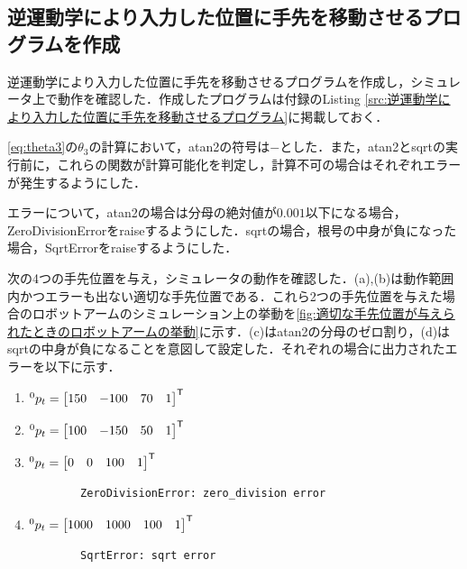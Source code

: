 \documentclass{ltjsarticle}
\begin{document}
\subsection{逆運動学により入力した位置に手先を移動させるプログラムを作成}\label{subsec:逆運動学により入力した位置に手先を移動させるプログラムを作成}
逆運動学により入力した位置に手先を移動させるプログラムを作成し，シミュレータ上で動作を確認した．作成したプログラムは付録のListing \ref{src:逆運動学により入力した位置に手先を移動させるプログラム}に掲載しておく．

\cref{eq:theta3}の$\theta_3$の計算において，atan2の符号は$-$とした．また，atan2とsqrtの実行前に，これらの関数が計算可能化を判定し，計算不可の場合はそれぞれエラーが発生するようにした．

エラーについて，atan2の場合は分母の絶対値が$0.001$以下になる場合，ZeroDivisionErrorをraiseするようにした．sqrtの場合，根号の中身が負になった場合，SqrtErrorをraiseするようにした．

次の4つの手先位置を与え，シミュレータの動作を確認した．(a),(b)は動作範囲内かつエラーも出ない適切な手先位置である．これら2つの手先位置を与えた場合のロボットアームのシミュレーション上の挙動を\cref{fig:適切な手先位置が与えられたときのロボットアームの挙動}に示す．(c)はatan2の分母のゼロ割り，(d)はsqrtの中身が負になることを意図して設定した．それぞれの場合に出力されたエラーを以下に示す．
\begin{enumerate}[label=(\alph*)]
	\item $^0p_t = \mqty[150 & -100 & 70 & 1]^\mathsf{T}$
	\item $^0p_t = \mqty[100 & -150 & 50 & 1]^\mathsf{T}$
	\item $^0p_t = \mqty[0 & 0 & 100 & 1]^\mathsf{T}$ \\
	\begin{lstlisting}
		ZeroDivisionError: zero_division error
	\end{lstlisting}
	\item $^0p_t = \mqty[1000 & 1000 & 100 & 1]^\mathsf{T}$ \\
	\begin{lstlisting}
		SqrtError: sqrt error
	\end{lstlisting}
\end{enumerate}
\end{document}
